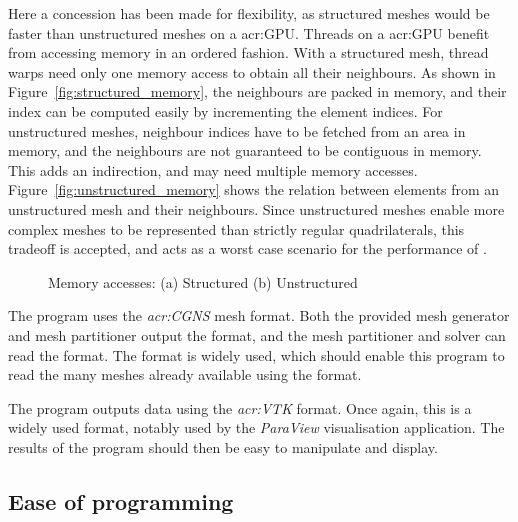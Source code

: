 Here a concession has been made for flexibility, as structured meshes would be faster than
unstructured meshes on a \acrshort{acr:GPU}. Threads on a \acrshort{acr:GPU} benefit from accessing
memory in an ordered fashion. With a structured mesh, thread warps need only one memory access to
obtain all their neighbours. As shown in Figure~\ref{fig:structured_memory}, the neighbours are
packed in memory, and their index can be computed easily by incrementing the element indices. For
unstructured meshes, neighbour indices have to be fetched from an area in memory, and the neighbours
are not guaranteed to be contiguous in memory. This adds an indirection, and may need multiple
memory accesses. Figure~\ref{fig:unstructured_memory} shows the relation between elements from an
unstructured mesh and their neighbours. Since unstructured meshes enable more complex meshes to be
represented than strictly regular quadrilaterals, this tradeoff is accepted, and acts as a worst
case scenario for the performance of .

\begin{figure}[H]
	\centering
	\hfill
	\caption{Memory accesses: (a) Structured (b) Unstructured}\label{fig:mesh_memory}
\end{figure}

The program uses the \textit{\acrfull{acr:CGNS}} mesh format. Both the provided mesh generator and
mesh partitioner output the format, and the mesh partitioner and solver can read the format. The
format is widely used, which should enable this program to read the many meshes already available
using the format.

The program outputs data using the \textit{\acrfull{acr:VTK}} format. Once again, this is a widely
used format, notably used by the \textit{ParaView} visualisation application. The results of the
program should then be easy to manipulate and display.

\subsection{Ease of programming}\label{subsection:graphics_processing_units:data_structure:ease_of_programming}

